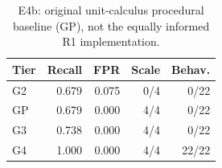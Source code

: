 \begin{table}[t]
\centering\footnotesize
\caption{E4b: original unit-calculus procedural baseline (GP), not the equally informed R1 implementation.}
\label{tab:archive-procedural}
\setlength{\tabcolsep}{3.5pt}
\begin{tabular}{@{}lrrrr@{}}
\toprule
Tier & Recall & FPR & Scale & Behav. \\
\midrule
G2 & 0.679 & 0.075 & 0/4 & 0/22 \\
GP & 0.679 & 0.000 & 4/4 & 0/22 \\
G3 & 0.738 & 0.000 & 4/4 & 0/22 \\
G4 & 1.000 & 0.000 & 4/4 & 22/22 \\
\bottomrule
\end{tabular}
\end{table}
